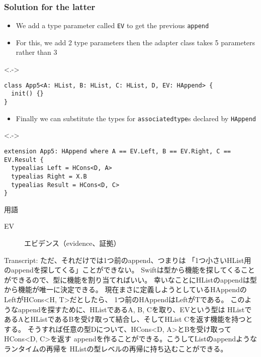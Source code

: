 \begin{frame}[fragile]
  \frametitle{Solution for the latter}

  \begin{itemize}
    \item<+-> We add a type parameter called \lstinline|EV|
    to get the previous \lstinline|append|

    \item<+-> For this, we add 2 type parameters then
    the adapter class takes 5 parameters rather than 3
  \end{itemize}

  \begin{uncoverenv}<.->
\begin{lstlisting}[style=swift]
class App5<A: HList, B: HList, C: HList, D, EV: HAppend> {
  init() {}
}
\end{lstlisting}
  \end{uncoverenv}

  \begin{itemize}
    \item<+-> Finally we can substitute the types for \lstinline|associatedtype|s
    declared by \lstinline|HAppend|
  \end{itemize}

  \begin{uncoverenv}<.->
\begin{lstlisting}[style=swift]
extension App5: HAppend where A == EV.Left, B == EV.Right, C == EV.Result {
  typealias Left = HCons<D, A>
  typealias Right = X.B
  typealias Result = HCons<D, C>
}
\end{lstlisting}
  \end{uncoverenv}

  \begin{notes}
    \item 用語
    \begin{description}
      \item[EV] エビデンス（evidence、証拠）
    \end{description}

    \item Transcript:
    ただ、それだけでは1つ前のappend、つまりは
    「1つ小さいHList用のappendを探してくる」ことができない。
    Swiftは型から機能を探してくることができるので、型に機能を割り当てればいい。
    幸いなことにHListのappendは型から機能が唯一に決定できる。
    現在まさに定義しようとしているHAppendのLeftがHCons<H, T>だとしたら、
    1つ前のHAppendはLeftがTである。
    このようなappendを探すために、HListであるA, B, Cを取り、EVという型は
    HListであるAとHListであるBを受け取って結合し、そしてHList Cを返す機能を持つとする。
    そうすれば任意の型Dについて、HCons<D, A>とBを受け取ってHCons<D, C>を返す
    appendを作ることができる。こうしてListのappendようなランタイムの再帰を
    HListの型レベルの再帰に持ち込むことができる。
  \end{notes}
\end{frame}

